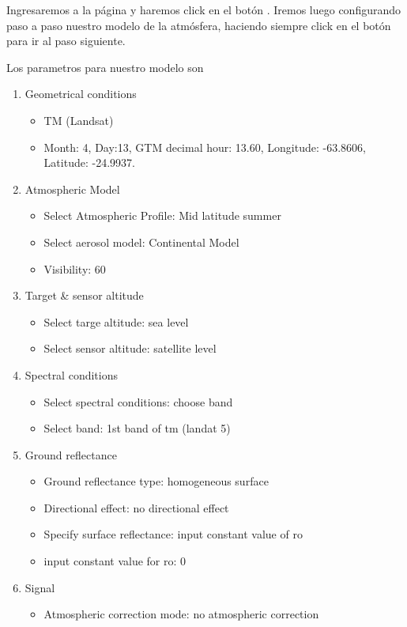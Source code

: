 Ingresaremos a la p\'agina y haremos click en el bot\'on
. Iremos luego configurando paso a paso nuestro modelo de la
atm\'osfera, haciendo siempre click en el bot\'on  para
ir al paso siguiente.

Los parametros para nuestro modelo son

\begin{enumerate}
    \item Geometrical conditions
        \begin{itemize}
            \item TM (Landsat)
            \item Month: 4, Day:13, GTM decimal hour: 13.60, Longitude:
                -63.8606, Latitude: -24.9937.
        \end{itemize}
    \item Atmospheric Model
        \begin{itemize}
            \item Select Atmospheric Profile: Mid latitude summer
            \item Select aerosol model: Continental Model
            \item Visibility: 60
        \end{itemize}
    \item Target \& sensor altitude
        \begin{itemize}
            \item Select targe altitude: sea level
            \item Select sensor altitude: satellite level
        \end{itemize}
    \item Spectral conditions
        \begin{itemize}
            \item Select spectral conditions: choose band
            \item Select band: 1st band of tm (landat 5)
        \end{itemize}
    \item Ground reflectance
        \begin{itemize}
            \item Ground reflectance type: homogeneous surface
            \item Directional effect: no directional effect
            \item Specify surface reflectance: input constant value of ro
            \item input constant value for ro: 0
        \end{itemize}
    \item Signal
        \begin{itemize}
            \item Atmospheric correction mode: no atmospheric correction
        \end{itemize}
\end{enumerate}

